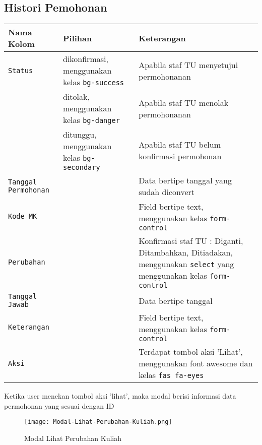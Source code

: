 \subsection{Histori Pemohonan}
\begin{tabular}{ |p{4cm}|p{2cm}|p{10cm}|  }
	\hline
	Nama Kolom & Pilihan & Keterangan\\
	\hline
	\texttt{Status} & dikonfirmasi, menggunakan kelas \verb|bg-success| & Apabila staf TU menyetujui permohonanan\\
	\hline
	&  ditolak, menggunakan kelas \verb|bg-danger|  & Apabila staf TU menolak permohonanan\\
	\hline
	& ditunggu, menggunakan kelas \verb|bg-secondary| &  Apabila staf TU belum konfirmasi permohonan \\
	\hline
	\texttt{Tanggal Permohonan}    & & Data bertipe tanggal yang sudah diconvert\\
	\hline
	\texttt{Kode MK} &  & Field bertipe text, menggunakan kelas \verb|form-control| \\
	\hline
	\texttt{Perubahan} &  &  Konfirmasi staf TU : Diganti, Ditambahkan, Ditiadakan, menggunakan \verb|select| yang menggunakan kelas \verb|form-control| \\
	\hline
	\texttt{Tanggal Jawab} &  & Data bertipe tanggal \\
	\hline
	\texttt{Keterangan} &  & Field bertipe text, menggunakan kelas \verb|form-control| \\
	\hline
	\texttt{Aksi} &  & Terdapat tombol aksi 'Lihat', menggunakan font awesome dan kelas \verb|fas fa-eyes| \\
	\hline
\end{tabular}
Ketika user menekan tombol aksi 'lihat', maka modal berisi informasi data permohonan yang sesuai dengan ID 
\begin{figure} [H]
	\centering  
	\texttt{[image: Modal-Lihat-Perubahan-Kuliah.png]}  
	\caption{Modal Lihat Perubahan Kuliah} 
\end{figure}


